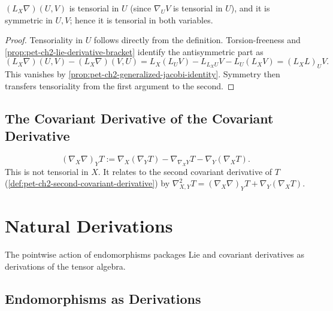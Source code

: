\begin{remark}
  \label{rem:pet-ch2-lie-derivative-connection-symmetric}


  $(L_X\nabla)(U,V)$ is tensorial in $U$ (since $\nabla_UV$ is tensorial in
  $U$), and it is symmetric in $U,V$; hence it is tensorial in both
  variables.
\end{remark}
\begin{proof}

  \sketch
  Tensoriality in $U$
  follows directly from the definition. Torsion-freeness and
  \cref{prop:pet-ch2-lie-derivative-bracket} identify the antisymmetric part as
  \[
    (L_X\nabla)(U,V)-(L_X\nabla)(V,U)
      =L_X(L_UV)-L_{L_XU}V-L_U(L_XV)
      =(L_XL)_UV.
  \]
  This vanishes by
  \cref{prop:pet-ch2-generalized-jacobi-identity}. Symmetry then transfers
  tensoriality from the first argument to the second.
\end{proof}

\subsection{The Covariant Derivative of the Covariant Derivative}

\begin{definition}
  \label{def:pet-ch2-covariant-derivative-connection}


  \[
    (\nabla_X\nabla)_YT := \nabla_X(\nabla_YT)-\nabla_{\nabla_XY}T-\nabla_Y(\nabla_XT).
  \]
  This is not tensorial in $X$. It relates to the second covariant derivative
  of $T$ (\cref{def:pet-ch2-second-covariant-derivative}) by
  $\nabla^2_{X,Y}T=(\nabla_X\nabla)_YT+\nabla_Y(\nabla_XT)$.
\end{definition}

\section{Natural Derivations}

The pointwise action of endomorphisms packages Lie and covariant derivatives
as derivations of the tensor algebra.

\subsection{Endomorphisms as Derivations}

